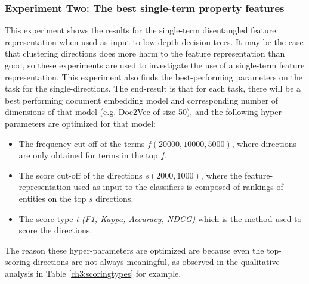 \subsubsection{Experiment Two: The best single-term property features}\label{ch3:ex2}

This  experiment shows the results for the single-term disentangled feature representation when used as input to low-depth decision trees. It may be the case that clustering directions does more harm to the feature representation than good, so these experiments are used to investigate the use of a single-term feature representation.  This experiment also finds  the best-performing parameters on the task for the single-directions. The end-result is that for each task, there will be a best performing document embedding model and corresponding number of dimensions of that model (e.g. Doc2Vec of size 50), and the following hyper-parameters are optimized for that model:

\begin{itemize}
	\item The frequency cut-off of the terms $f (20000, 10000, 5000) $, where directions are only obtained for terms in the top $f$.
	\item The score cut-off of the directions $s (2000, 1000)$, where the feature-representation used as input to the classifiers is composed of rankings of entities on the top $s$ directions.
	\item The score-type \textit{t ({F1}, {Kappa}, {Accuracy}, {NDCG})} which is the method used to score the directions.
\end{itemize}

The reason these hyper-parameters are optimized are because even the top-scoring directions are not always meaningful, as  observed in the qualitative analysis in Table \ref{ch3:scoringtypes} for example.





